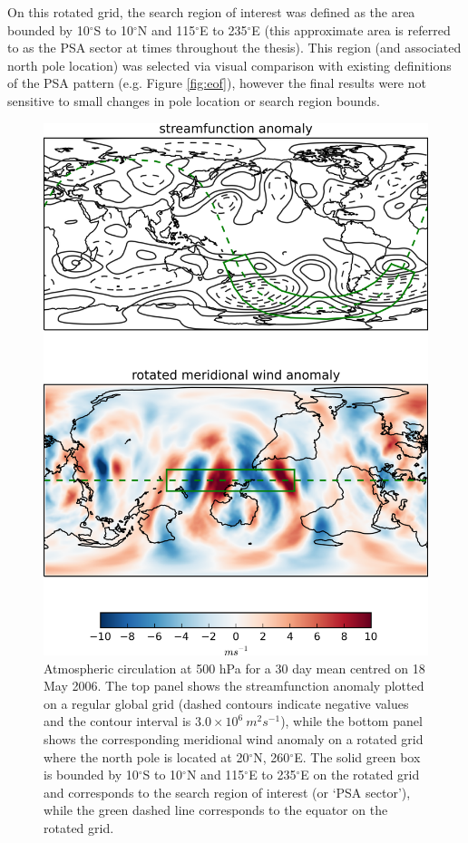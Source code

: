 On this rotated grid, the search region of interest was defined as the area bounded by 10$^{\circ}$S to 10$^{\circ}$N and 115$^{\circ}$E to 235$^{\circ}$E (this approximate area is referred to as the PSA sector at times throughout the thesis). This region (and associated north pole location) was selected via visual comparison with existing definitions of the PSA pattern (e.g. Figure \ref{fig:eof}), however the final results were not sensitive to small changes in pole location or search region bounds.

\begin{figure}
\begin{center}
\includegraphics[width=0.7\columnwidth]{figures/psa/rotation_example_2006-05-18.png}
\caption[Coordinate system rotation and corresponding 500 hPa meridional wind conversion for a 30 day mean centred on 18 May 2006]{\label{fig:rotation}
Atmospheric circulation at 500 hPa for a 30 day mean centred on 18 May 2006. The top panel shows the streamfunction anomaly plotted on a regular global grid (dashed contours indicate negative values and the contour interval is $3.0 \times 10^6 \: m^2 s^{-1}$), while the bottom panel shows the corresponding meridional wind anomaly on a rotated grid where the north pole is located at 20$^{\circ}$N, 260$^{\circ}$E. The solid green box is bounded by 10$^{\circ}$S to 10$^{\circ}$N and 115$^{\circ}$E to 235$^{\circ}$E on the rotated grid and corresponds to the search region of interest (or `PSA sector'), while the green dashed line corresponds to the equator on the rotated grid.%
}
\end{center}
\end{figure}

